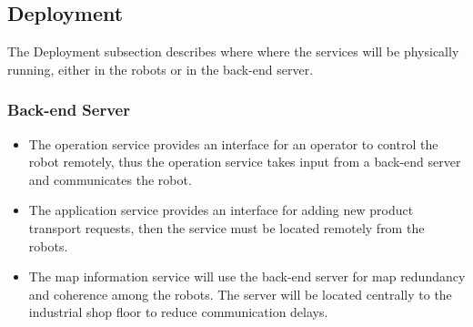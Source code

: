 \subsection{Deployment}
The Deployment subsection describes where where the services will be physically running, either in the robots or in the back-end server. 

\subsubsection{Back-end Server}
\begin{itemize}
	\item The operation service provides an interface for an operator to control the robot remotely, thus the operation service takes input from a back-end server and communicates the robot. 
	\item The application service provides an interface for adding new product transport requests, then the service must be located remotely from the robots.
	\item The map information service will use the back-end server for map redundancy and coherence among the robots. The server will be located centrally to the industrial shop floor to reduce communication delays.
\end{itemize}

